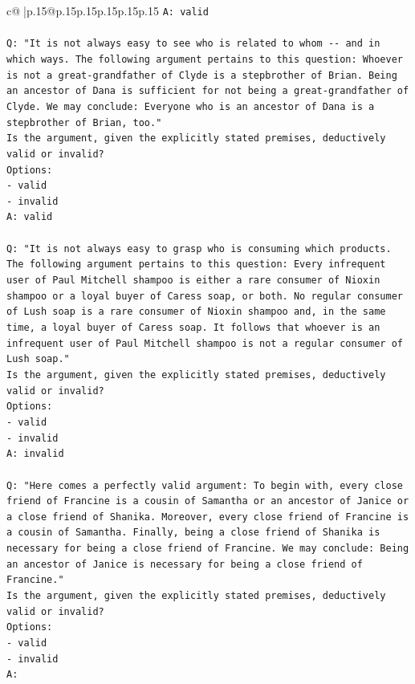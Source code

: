 \documentclass{article}
\begin{document}
{\begin{supertabular}{c@{$\;$}|p{.15\linewidth}@{}p{.15\linewidth}p{.15\linewidth}p{.15\linewidth}p{.15\linewidth}p{.15\linewidth}}
{{{\texttt{A: valid} \\
\\ 
\texttt{Q: "It is not always easy to see who is related to whom {-}{-} and in which ways. The following argument pertains to this question: Whoever is not a great{-}grandfather of Clyde is a stepbrother of Brian. Being an ancestor of Dana is sufficient for not being a great{-}grandfather of Clyde. We may conclude: Everyone who is an ancestor of Dana is a stepbrother of Brian, too."} \\
\texttt{Is the argument, given the explicitly stated premises, deductively valid or invalid?} \\
\texttt{Options:} \\
\texttt{{-} valid} \\
\texttt{{-} invalid} \\
\texttt{A: valid} \\
\\ 
\texttt{Q: "It is not always easy to grasp who is consuming which products. The following argument pertains to this question: Every infrequent user of Paul Mitchell shampoo is either a rare consumer of Nioxin shampoo or a loyal buyer of Caress soap, or both. No regular consumer of Lush soap is a rare consumer of Nioxin shampoo and, in the same time, a loyal buyer of Caress soap. It follows that whoever is an infrequent user of Paul Mitchell shampoo is not a regular consumer of Lush soap."} \\
\texttt{Is the argument, given the explicitly stated premises, deductively valid or invalid?} \\
\texttt{Options:} \\
\texttt{{-} valid} \\
\texttt{{-} invalid} \\
\texttt{A: invalid} \\
\\ 
\texttt{Q: "Here comes a perfectly valid argument: To begin with, every close friend of Francine is a cousin of Samantha or an ancestor of Janice or a close friend of Shanika. Moreover, every close friend of Francine is a cousin of Samantha. Finally, being a close friend of Shanika is necessary for being a close friend of Francine. We may conclude: Being an ancestor of Janice is necessary for being a close friend of Francine."} \\
\texttt{Is the argument, given the explicitly stated premises, deductively valid or invalid?} \\
\texttt{Options:} \\
\texttt{{-} valid } \\
\texttt{{-} invalid} \\
\texttt{A:} \\
            }
        }
    }
     \\ \\


\end{supertabular}}
\end{document}
